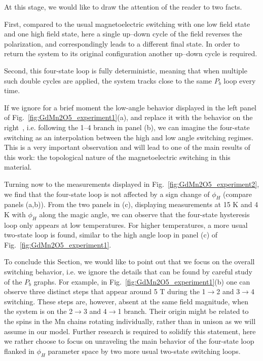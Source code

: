 At this stage, we would like to draw the attention of the reader to two facts.

First, compared to the usual magnetoelectric switching with one low field state and one high field state, here a single up--down cycle of the field reverses the polarization, and correspondingly leads to a different final state.
In order to return the system to its original configuration another up--down cycle is required.

Second, this four-state loop is fully deterministic, meaning that when multiple such double cycles are applied, the system tracks close to the same $P_b$ loop every time.

If we ignore for a brief moment the low-angle behavior displayed in the left panel of Fig.~\ref{fig:GdMn2O5_experiment1}(a), and replace it with the behavior on the right~\cite{Lee13}, i.e. following the 1--4 branch in panel (b), we can imagine the four-state switching as an interpolation between the high and low angle switching regimes.
This is a very important observation and will lead to one of the main results of this work: the topological nature of the magnetoelectric switching in this material.

Turning now to the measurements displayed in Fig.~\ref{fig:GdMn2O5_experiment2}, we find that the four-state loop is not affected by a sign change of $\phi_H$ (compare panels (a,b)).
From the two panels in (c), displaying measurements at 15 K and 4 K with $\phi_H$ along the magic angle, we can observe that the four-state hysteresis loop only appears at low temperatures.
For higher temperatures, a more usual two-state loop is found, similar to the high angle loop in panel (c) of Fig.~\ref{fig:GdMn2O5_experiment1}.

To conclude this Section, we would like to point out that we focus on the overall switching behavior, i.e. we ignore the details that can be found by careful study of the $P_b$ graphs.
For example, in Fig.~\ref{fig:GdMn2O5_experiment1}(b) one can observe three distinct steps that appear around 5 T during the 1$\rightarrow$2 and 3$\rightarrow$4 switching.
These steps are, however, absent at the same field magnitude, when the system is on the 2$\rightarrow$3 and 4$\rightarrow$1 branch.
Their origin might be related to the spins in the Mn chains rotating individually, rather than in unison as we will assume in our model.
Further research is required to solidify this statement, here we rather choose to focus on unraveling the main behavior of the four-state loop flanked in $\phi_H$ parameter space by two more usual two-state switching loops.

